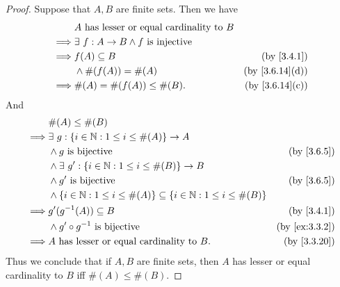 \begin{proof}
  Suppose that \(A, B\) are finite sets.
  Then we have
  \begin{align*}
             & A \text{ has lesser or equal cardinality to } B                                  \\
    \implies & \exists\ f : A \to B \land f \text{ is injective}                                \\
    \implies & f(A) \subseteq B                                  & \text{(by \cref{3.4.1})}     \\
             & \land \#(f(A)) = \#(A)                            & \text{(by \cref{3.6.14}(d))} \\
    \implies & \#(A) = \#(f(A)) \leq \#(B).                      & \text{(by \cref{3.6.14}(c))}
  \end{align*}
  And
  \begin{align*}
             & \#(A) \leq \#(B)                                                                                                    \\
    \implies & \exists\ g : \{i \in \N : 1 \leq i \leq \#(A)\} \to A                                                               \\
             & \land g \text{ is bijective}                                                          & \text{(by \cref{3.6.5})}    \\
             & \land \exists\ g' : \{i \in \N : 1 \leq i \leq \#(B)\} \to B                                                        \\
             & \land g' \text{ is bijective}                                                         & \text{(by \cref{3.6.5})}    \\
             & \land \{i \in \N : 1 \leq i \leq \#(A)\} \subseteq \{i \in \N : 1 \leq i \leq \#(B)\}                               \\
    \implies & g'(g^{-1}(A)) \subseteq B                                                             & \text{(by \cref{3.4.1})}    \\
             & \land g' \circ g^{-1} \text{ is bijective}                                            & \text{(by \cref{ex:3.3.2})} \\
    \implies & A \text{ has lesser or equal cardinality to } B.                                      & \text{(by \cref{3.3.20})}
  \end{align*}
  Thus we conclude that if \(A, B\) are finite sets, then \(A\) has lesser or equal cardinality to \(B\) iff \(\#(A) \leq \#(B)\).
\end{proof}

